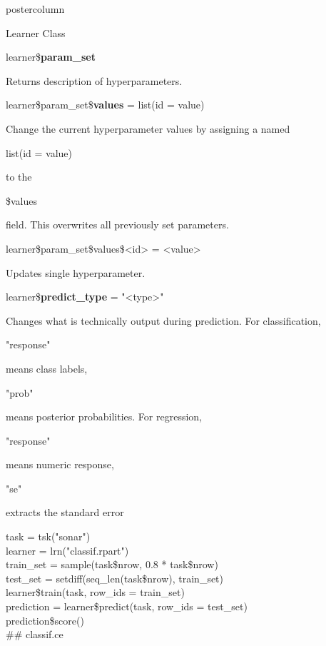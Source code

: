\documentclass{beamer}
\newcommand{\codeinline}[1]{\begin{codeboxinline}#1\end{codeboxinline}}
\begin{document}
\begin{frame}[fragile]{}
\begin{columns}
\begin{column}{.245\textwidth}
\begin{beamercolorbox}[center]{postercolumn}
\begin{minipage}{.98\textwidth}
{\begin{myblock}{Learner Class}
						\\
						\vspace{1em}
						\begin{codebox}
							learner\$\textbf{param\_set}
						\end{codebox}
						Returns description of hyperparameters.	
						\\
						\begin{codebox}
							learner\$param\_set\$\textbf{values} = list(id = value)
						\end{codebox}
						Change the current hyperparameter values by assigning a named \codeinline{list(id = value)} to the \codeinline{\$values} field.
						This overwrites all previously set parameters.	
						\\
						\begin{codebox}
							learner\$param\_set\$values\$<id> = <value>
						\end{codebox}
						Updates single hyperparameter.
						\vspace{1em}
						\\
						\begin{codebox}
							learner\$\textbf{predict\_type} = "<type>"
						\end{codebox}
						Changes what is technically output during prediction. For classification, 
                        \codeinline{"response"} means class labels, \codeinline{"prob"} means posterior probabilities. For regression, \codeinline{"response"} means numeric response, 
                        \codeinline{"se"} extracts the standard error 
						\vspace{1em}
						\begin{codeboxexample}
							{\scriptsize
								task = tsk("sonar")\\
								learner = lrn("classif.rpart")
								\vspace{1em}
								\\
								train\_set = sample(task\$nrow, 0.8 * task\$nrow)\\
								test\_set = setdiff(seq\_len(task\$nrow), train\_set)
								\vspace{1em}
								\\
								learner\$train(task, row\_ids = train\_set)
								\vspace{1em}
								\\
								prediction = learner\$predict(task, row\_ids = test\_set)\\
								prediction\$score()\\
								\#\# classif.ce\\
}
\end{codeboxexample}
\end{myblock}}
\end{minipage}
\end{beamercolorbox}
\end{column}
\end{columns}
\end{frame}
\end{document}
